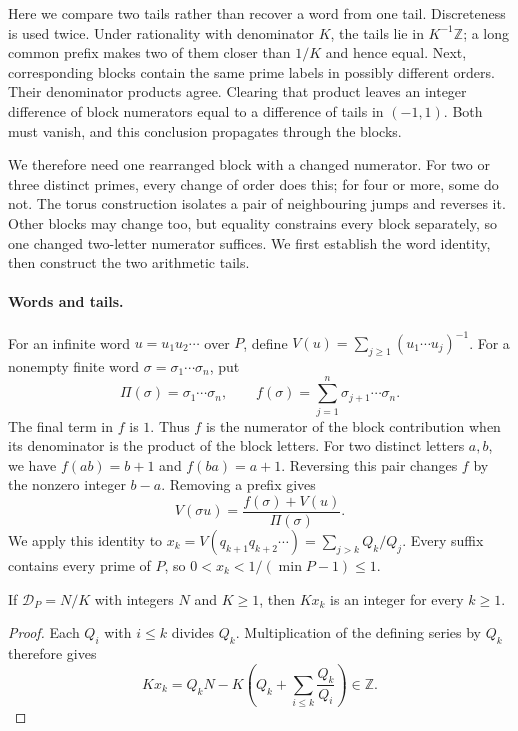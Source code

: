 Here we compare two tails rather than recover a word from one tail.
Discreteness is used twice. Under rationality with denominator $K$, the
tails lie in $K^{-1}\mathbb Z$; a long common prefix makes two of them
closer than $1/K$ and hence equal. Next, corresponding blocks contain
the same prime labels in possibly different orders. Their denominator
products agree. Clearing that product leaves an integer difference of
block numerators equal to a difference of tails in $(-1,1)$. Both must
vanish, and this conclusion propagates through the blocks.

We therefore need one rearranged block with a changed numerator.
For two or three distinct primes, every change of order does this;
for four or more, some do not. The torus construction isolates a pair
of neighbouring jumps and reverses it. Other blocks may change too,
but equality constrains every block separately, so one changed
two-letter numerator suffices. We first establish the word identity,
then construct the two arithmetic tails.

\paragraph{Words and tails.}\label{long269:sec:words}
For an infinite word $u=u_1u_2\cdots$ over $P$, define
$V(u)=\sum_{j\ge1}(u_1\cdots u_j)^{-1}$. For a nonempty finite word
$\sigma=\sigma_1\cdots\sigma_n$, put
\[
 \Pi(\sigma)=\sigma_1\cdots\sigma_n,\qquad
 f(\sigma)=\sum_{j=1}^{n}\sigma_{j+1}\cdots\sigma_n.
\]
The final term in $f$ is $1$. Thus $f$ is the numerator of the block
contribution when its denominator is the product of the block letters.
For two distinct letters $a,b$, we have $f(ab)=b+1$ and $f(ba)=a+1$.
Reversing this pair changes $f$ by the nonzero integer $b-a$.
Removing a prefix gives
\begin{equation}\label{long269:eq:word-shift}
 V(\sigma u)=\frac{f(\sigma)+V(u)}{\Pi(\sigma)}.
\end{equation}
We apply this identity to
$x_k=V(q_{k+1}q_{k+2}\cdots)=\sum_{j>k}Q_k/Q_j$.
Every suffix contains every prime of $P$, so
$0<x_k<1/(\min P-1)\le1$.

\begin{remark}\label{long269:res:dp-integral-tails}
If $\mathcal D_P=N/K$ with integers $N$ and $K\ge1$, then $Kx_k$ is an
integer for every $k\ge1$.
\end{remark}
\begin{proof}
Each $Q_i$ with $i\le k$ divides $Q_k$. Multiplication of the defining
series by $Q_k$ therefore gives
\[
 Kx_k=Q_kN-K\left(Q_k+\sum_{i\le k}\frac{Q_k}{Q_i}\right)\in\mathbb Z.
\]
\end{proof}


